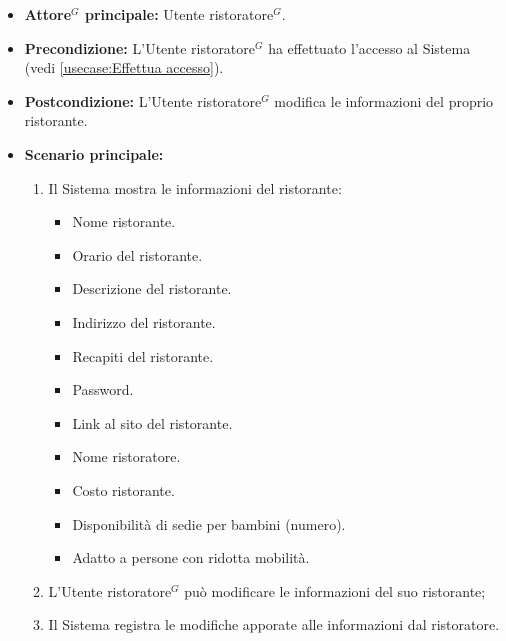 \label{usecase:Modifica informazioni ristorante}
\begin{itemize}
	\item \textbf{\gls{Attore}$^G$ principale:} \gls{Utente ristoratore}$^G$.

	\item \textbf{Precondizione:} L'\gls{Utente ristoratore}$^G$ ha effettuato l'accesso al Sistema (vedi \autoref{usecase:Effettua accesso}).

	\item \textbf{Postcondizione:} L'\gls{Utente ristoratore}$^G$ modifica le informazioni del proprio ristorante.


	\item \textbf{Scenario principale:}
	      \begin{enumerate}

		      \item Il Sistema mostra le informazioni del ristorante:
		      \begin{itemize}
                \item Nome ristorante.
                \item Orario del ristorante.
                \item Descrizione del ristorante.
                \item Indirizzo del ristorante.
                \item Recapiti del ristorante.
                \item Password. 
                \item Link al sito del ristorante.
                \item Nome ristoratore.
                \item Costo ristorante.
                \item Disponibilità di sedie per bambini (numero).
                \item Adatto a persone con ridotta mobilità.
              \end{itemize}

		      \item L'\gls{Utente ristoratore}$^G$ può modificare le informazioni del suo ristorante;
		      \item Il Sistema registra le modifiche apporate alle informazioni dal ristoratore.

	      \end{enumerate}
\end{itemize}
